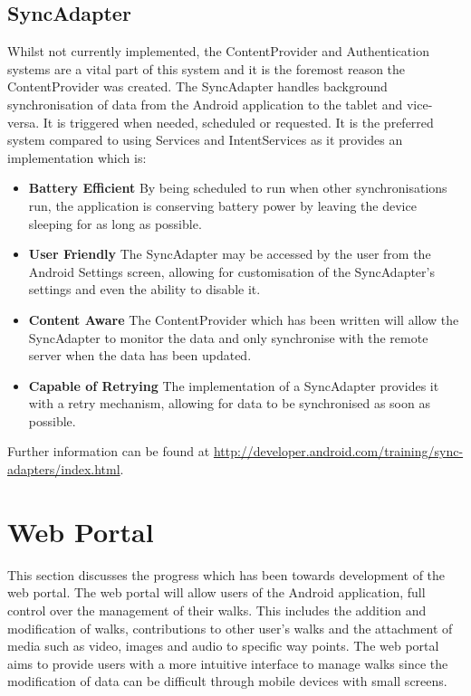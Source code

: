 \documentclass[11pt,a4paper]{article}
\begin{document}
\subsection{SyncAdapter}
\label{sec:syncAdapter}
Whilst not currently implemented, the ContentProvider and Authentication systems are a vital part of this system and it is the foremost reason the ContentProvider was created. The SyncAdapter handles background synchronisation of data from the Android application to the tablet and vice-versa. It is triggered when needed, scheduled or requested. It is the preferred system compared to using Services and IntentServices as it provides an implementation which is:
\begin{itemize}
\item \textbf{Battery Efficient} By being scheduled to run when other synchronisations run, the application is conserving battery power by leaving the device sleeping for as long as possible.
\item \textbf{User Friendly} The SyncAdapter may be accessed by the user from the Android Settings screen, allowing for customisation of the SyncAdapter's settings and even the ability to disable it.
\item \textbf{Content Aware} The ContentProvider which has been written will allow the SyncAdapter to monitor the data and only synchronise with the remote server when the data has been updated.
\item \textbf{Capable of Retrying} The implementation of a SyncAdapter provides it with a retry mechanism, allowing for data to be synchronised as soon as possible.
\end{itemize}

Further information can be found at \url{http://developer.android.com/training/sync-adapters/index.html}.

\section{Web Portal}
\label{sec:web-portal}

This section discusses the progress which has been towards development of the web portal. The web portal will allow users of the Android application, full control over the management of their walks. This includes the addition and modification of walks, contributions to other user's walks and the attachment of media such as video, images and audio to specific way points. The web portal aims to provide users with a more intuitive interface to manage walks since the modification of data can be difficult through mobile devices with small screens. 
\end{document}
